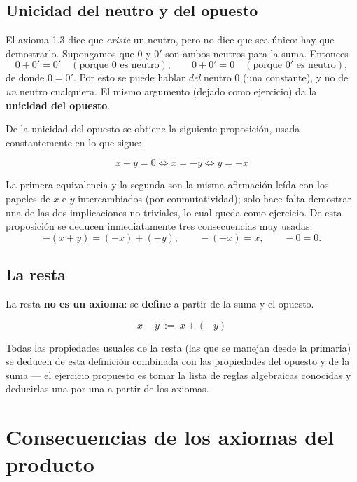 \documentclass[12pt,a4paper]{article}
\begin{document}
\subsection{Unicidad del neutro y del opuesto}

El axioma 1.3 dice que \emph{existe} un neutro, pero no dice que sea único:
hay que demostrarlo. Supongamos que $0$ y $0'$ son ambos neutros para la
suma. Entonces
\[
0 + 0' = 0' \quad (\text{porque } 0 \text{ es neutro}), \qquad
0 + 0' = 0 \quad (\text{porque } 0' \text{ es neutro}),
\]
de donde $0=0'$. Por esto se puede hablar \emph{del} neutro $0$ (una
constante), y no de \emph{un} neutro cualquiera. El mismo argumento
(dejado como ejercicio) da la \textbf{unicidad del opuesto}.

De la unicidad del opuesto se obtiene la siguiente proposición, usada
constantemente en lo que sigue:

\begin{keybox}
\[
\boxed{x+y = 0 \iff x = -y \iff y = -x}
\]
\end{keybox}

La primera equivalencia y la segunda son la misma afirmación leída con los
papeles de $x$ e $y$ intercambiados (por conmutatividad); solo hace falta
demostrar una de las dos implicaciones no triviales, lo cual queda como
ejercicio. De esta proposición se deducen inmediatamente tres consecuencias
muy usadas:
\[
-(x+y) = (-x) + (-y), \qquad -(-x) = x, \qquad -0 = 0.
\]

\subsection{La resta}

La resta \textbf{no es un axioma}: se \textbf{define} a partir de la suma y
el opuesto.

\begin{keybox}
\[
\boxed{x - y \ := \ x + (-y)}
\]
\end{keybox}

Todas las propiedades usuales de la resta (las que se manejan desde la
primaria) se deducen de esta definición combinada con las propiedades del
opuesto y de la suma --- el ejercicio propuesto es tomar la lista de reglas
algebraicas conocidas y deducirlas una por una a partir de los axiomas.

\section{Consecuencias de los axiomas del producto}
\end{document}
